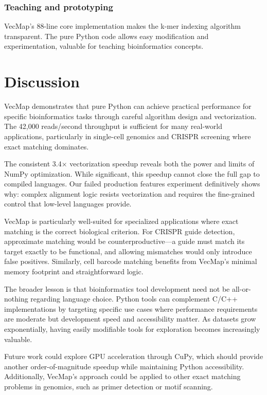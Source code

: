 \documentclass[12pt]{article}
\begin{document}
\subsubsection{Teaching and prototyping}
VecMap's 88-line core implementation makes the k-mer indexing algorithm transparent. The pure Python code allows easy modification and experimentation, valuable for teaching bioinformatics concepts.

\section{Discussion}

VecMap demonstrates that pure Python can achieve practical performance for specific bioinformatics tasks through careful algorithm design and vectorization. The 42,000 reads/second throughput is sufficient for many real-world applications, particularly in single-cell genomics and CRISPR screening where exact matching dominates.

The consistent 3.4× vectorization speedup reveals both the power and limits of NumPy optimization. While significant, this speedup cannot close the full gap to compiled languages. Our failed production features experiment definitively shows why: complex alignment logic resists vectorization and requires the fine-grained control that low-level languages provide.

VecMap is particularly well-suited for specialized applications where exact matching is the correct biological criterion. For CRISPR guide detection, approximate matching would be counterproductive---a guide must match its target exactly to be functional, and allowing mismatches would only introduce false positives. Similarly, cell barcode matching benefits from VecMap's minimal memory footprint and straightforward logic.

The broader lesson is that bioinformatics tool development need not be all-or-nothing regarding language choice. Python tools can complement C/C++ implementations by targeting specific use cases where performance requirements are moderate but development speed and accessibility matter. As datasets grow exponentially, having easily modifiable tools for exploration becomes increasingly valuable.

Future work could explore GPU acceleration through CuPy, which should provide another order-of-magnitude speedup while maintaining Python accessibility. Additionally, VecMap's approach could be applied to other exact matching problems in genomics, such as primer detection or motif scanning.
\end{document}
